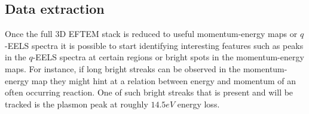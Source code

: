 \subsection{Data extraction}
Once the full 3D EFTEM stack is reduced to useful momentum-energy maps or $q$-EELS spectra it is possible to start identifying interesting features such as peaks in the $q$-EELS spectra at certain regions or bright spots in the momentum-energy maps. For instance, if long bright streaks can be observed in the momentum-energy map they might hint at a relation between energy and momentum of an often occurring reaction. One of such bright streaks that is present and will be tracked is the plasmon peak at roughly $14.5eV$ energy loss.

